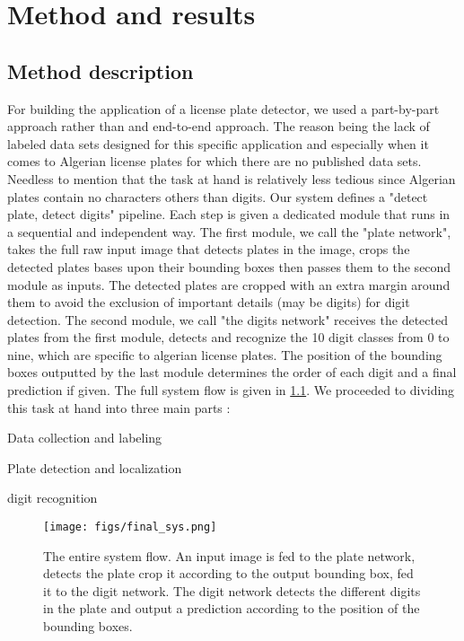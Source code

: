 \chapter{Method and results}

\section{Method description}
For building the application of a license plate detector, we used a part-by-part approach rather than and end-to-end approach. The reason being the lack of labeled data sets designed for this specific application and especially when it comes to Algerian license plates for which there are no published data sets. Needless to mention that the task at hand is relatively less tedious since Algerian plates contain no characters others than digits. Our system defines a "detect plate, detect digits" pipeline. Each step is given a dedicated module that runs in a sequential and independent way. The first module, we call the "plate network", takes the full raw input image that detects plates in the image, crops the detected plates bases upon their bounding boxes then passes them to the second module as inputs. The detected plates are cropped with an extra margin around them to avoid the exclusion of important details (may be digits) for digit detection. The second module, we call "the digits network" receives the detected plates from the first module, detects and recognize the 10 digit classes from 0 to nine, which are specific to algerian license plates. The position of the bounding boxes outputted by the last module determines the order of each digit and a final prediction if given. The full system flow is given
in \cref{fig:full_sys}. We proceeded to dividing this task at hand into three main parts :

\begin{compactitem}
	\item Data collection and labeling
	\item Plate detection and localization
	\item digit recognition
\end{compactitem}

\begin{figure}[!htpb]
	\centering
	\texttt{[image: figs/final\_sys.png]}
	\caption[The entire system flow]{The entire system flow. An input image is fed to the plate network, detects the plate crop it according to the output bounding box, fed it to the digit network. The digit network detects the different digits in the plate and output a prediction according to the position of the bounding boxes.}
	\label{fig:full_sys}
\end{figure}

